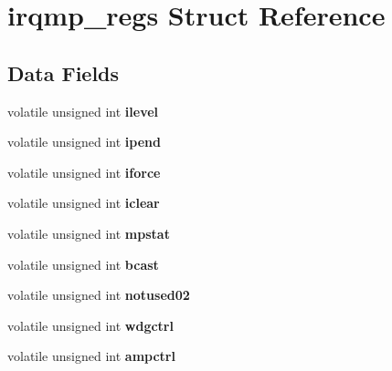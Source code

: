 \hypertarget{structirqmp__regs}{}\section{irqmp\+\_\+regs Struct Reference}
\label{structirqmp__regs}
\subsection*{Data Fields}
\begin{DoxyCompactItemize}
\item 
\mbox{\label{structirqmp__regs_af9462fff5a4721ac78107e6087735452}} 
volatile unsigned int {\bfseries ilevel}
\item 
\mbox{\label{structirqmp__regs_a3ce608ca26aadb4da4cfc7a34dc58a9f}} 
volatile unsigned int {\bfseries ipend}
\item 
\mbox{\label{structirqmp__regs_a909a1bb3f3e5292ccd08215dfa789689}} 
volatile unsigned int {\bfseries iforce}
\item 
\mbox{\label{structirqmp__regs_a5a6b957eea6302a17e80509f801b4a8c}} 
volatile unsigned int {\bfseries iclear}
\item 
\mbox{\label{structirqmp__regs_ab399ca71a8333d7f5031478b0f901ffb}} 
volatile unsigned int {\bfseries mpstat}
\item 
\mbox{\label{structirqmp__regs_a9dfb1850bdc501ac8f7735765ce69310}} 
volatile unsigned int {\bfseries bcast}
\item 
\mbox{\label{structirqmp__regs_a034cca295430e2f59226ca95efc03d2d}} 
volatile unsigned int {\bfseries notused02}
\item 
\mbox{\label{structirqmp__regs_a3e5365b73756a1264e0f984ef6bbf0c3}} 
volatile unsigned int {\bfseries wdgctrl}
\item 
\mbox{\label{structirqmp__regs_a8ff1e117d17f932331221ef0e98efe0a}} 
volatile unsigned int {\bfseries ampctrl}
\item 
\mbox{\label{structirqmp__regs_ae304309a83aabbd028fc650619364eed}} 

\end{DoxyCompactItemize}
